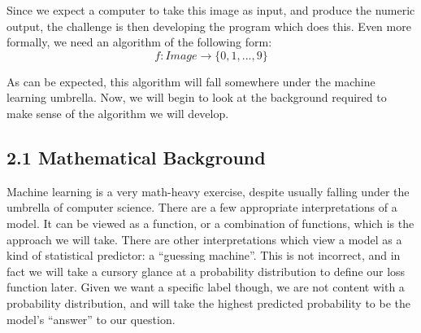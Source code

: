\documentclass{article}
\begin{document}
Since we expect a computer to take this image as input, and produce the numeric output, the challenge is then developing the program which does this. Even more formally, we need an algorithm of the following form: 
\[f: Image \rightarrow \{0,1,...,9\}\]

As can be expected, this algorithm will fall somewhere under the machine learning umbrella. Now, we will begin to look at the background required to make sense of the algorithm we will develop.
\\
\subsection*{2.1 Mathematical Background}
Machine learning is a very math-heavy exercise, despite usually falling under the umbrella of computer science. There are a few appropriate interpretations of a model. It can be viewed as a function, or a combination of functions, which is the approach we will take. There are other interpretations which view a model as a kind of statistical predictor: a “guessing machine”. This is not incorrect, and in fact we will take a cursory glance at a probability distribution to define our loss function later. Given we want a specific label though, we are not content with a probability distribution, and will take the highest predicted probability to be the model’s “answer” to our question.
\\
\end{document}

